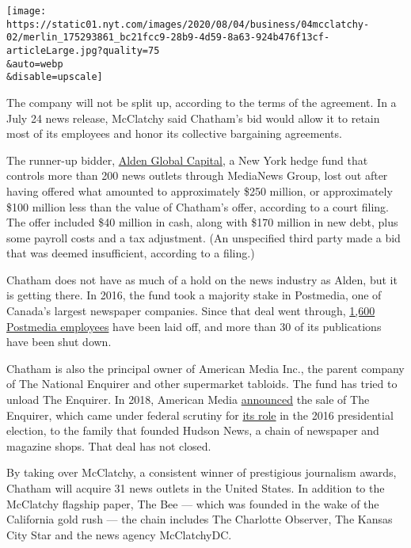 \texttt{[image: https://static01.nyt.com/images/2020/08/04/business/04mcclatchy-02/merlin\_175293861\_bc21fcc9-28b9-4d59-8a63-924b476f13cf-articleLarge.jpg?quality=75\\\&auto=webp\\\&disable=upscale]}

The company will not be split up, according to the terms of the
agreement. In a July 24 news release, McClatchy said Chatham's bid would
allow it to retain most of its employees and honor its collective
bargaining agreements.

The runner-up bidder,
\href{https://www.nytimes.com/2020/07/02/business/media/tribune-alden-board-seat.html}{Alden
Global Capital}, a New York hedge fund that controls more than 200 news
outlets through MediaNews Group, lost out after having offered what
amounted to approximately \$250 million, or approximately \$100 million
less than the value of Chatham's offer, according to a court filing. The
offer included \$40 million in cash, along with \$170 million in new
debt, plus some payroll costs and a tax adjustment. (An unspecified
third party made a bid that was deemed insufficient, according to a
filing.)

Chatham does not have as much of a hold on the news industry as Alden,
but it is getting there. In 2016, the fund took a majority stake in
Postmedia, one of Canada's largest newspaper companies. Since that deal
went through,
\href{https://www.nytimes.com/2020/07/16/business/media/hedge-fund-chatham-mcclatchy-postmedia-newspapers.html}{1,600
Postmedia employees} have been laid off, and more than 30 of its
publications have been shut down.

Chatham is also the principal owner of American Media Inc., the parent
company of The National Enquirer and other supermarket tabloids. The
fund has tried to unload The Enquirer. In 2018, American Media
\href{https://www.nytimes.com/2019/04/18/business/media/national-enquirer-james-cohen-hudson-news.html}{announced}
the sale of The Enquirer, which came under federal scrutiny for
\href{https://www.nytimes.com/2018/04/12/us/national-enquirer-doorman-trump.html}{its
role} in the 2016 presidential election, to the family that founded
Hudson News, a chain of newspaper and magazine shops. That deal has not
closed.

By taking over McClatchy, a consistent winner of prestigious journalism
awards, Chatham will acquire 31 news outlets in the United States. In
addition to the McClatchy flagship paper, The Bee --- which was founded
in the wake of the California gold rush --- the chain includes The
Charlotte Observer, The Kansas City Star and the news agency
McClatchyDC.

